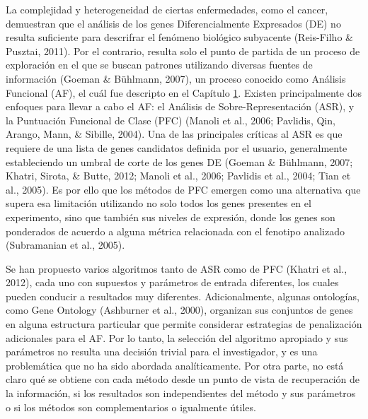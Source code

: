 \documentclass[12pt,twoside]{reedthesis}
\begin{document}
\par

La complejidad y heterogeneidad de ciertas enfermedades, como el cancer, demuestran que el análisis de los genes Diferencialmente Expresados (DE) no resulta suficiente para descrifrar el fenómeno biológico subyacente (Reis-Filho \& Pusztai, 2011). Por el contrario, resulta solo el punto de partida de un proceso de exploración en el que se buscan patrones utilizando diversas fuentes de información (Goeman \& Bühlmann, 2007), un proceso conocido como Análisis Funcional (AF), el cuál fue descripto en el Capítulo \protect\hyperlink{cap:af}{1}. Existen principalmente dos enfoques para llevar a cabo el AF: el Análisis de Sobre-Representación (ASR), y la Puntuación Funcional de Clase (PFC) (Manoli et al., 2006; Pavlidis, Qin, Arango, Mann, \& Sibille, 2004). Una de las principales críticas al ASR es que requiere de una lista de genes candidatos definida por el usuario, generalmente estableciendo un umbral de corte de los genes DE (Goeman \& Bühlmann, 2007; Khatri, Sirota, \& Butte, 2012; Manoli et al., 2006; Pavlidis et al., 2004; Tian et al., 2005). Es por ello que los métodos de PFC emergen como una alternativa que supera esa limitación utilizando no solo todos los genes presentes en el experimento, sino que también sus niveles de expresión, donde los genes son ponderados de acuerdo a alguna métrica relacionada con el fenotipo analizado (Subramanian et al., 2005).

\par

Se han propuesto varios algoritmos tanto de ASR como de PFC (Khatri et al., 2012), cada uno con supuestos y parámetros de entrada diferentes, los cuales pueden conducir a resultados muy diferentes. Adicionalmente, algunas ontologías, como Gene Ontology (Ashburner et al., 2000), organizan sus conjuntos de genes en alguna estructura particular que permite considerar estrategias de penalización adicionales para el AF. Por lo tanto, la selección del algoritmo apropiado y sus parámetros no resulta una decisión trivial para el investigador, y es una problemática que no ha sido abordada analíticamente. Por otra parte, no está claro qué se obtiene con cada método desde un punto de vista de recuperación de la información, si los resultados son independientes del método y sus parámetros o si los métodos son complementarios o igualmente útiles.

\par
\end{document}
